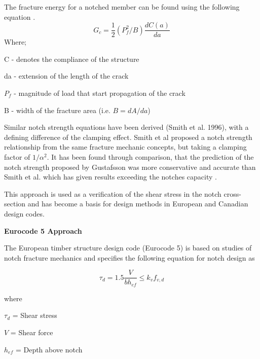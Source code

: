 \documentclass[11pt,a4paper]{article}
\numberwithin{equation}{subsection}
\begin{document}
	\noindent 	
	The fracture energy for a notched member can be found using the following equation \cite{serrano_fracture_2007}.  	 	
	\begin{equation} 		
	G_{c} = \dfrac{1}{2}(P_{f}^{2}/B) \dfrac{dC(a)}{da}  	\end{equation} 	 	
	Where;\par 	
	C - denotes the compliance of the structure\par 	
	da - extension of the length of the crack\par 	
	$P_{f}$ - magnitude of load that start propagation of the crack\par 	
	B - width of the fracture area (i.e. $B = dA/da$) 
	   
	 \vspace*{\baselineskip} 	 	
	 
	 \noindent 
	 Similar notch strength equations have been derived (Smith et al. 1996), with a defining difference of the clamping effect. Smith et al proposed a notch strength relationship from the same fracture mechanic concepts, but taking a clamping factor of $1/\alpha^{2}$. It has been found through comparison, that the prediction of the notch strength proposed by Gustafsson was more conservative and accurate than Smith et al. which has given results exceeding the notches capacity \cite{jockwer_state---art_2013}.   	
	 
	 \vspace*{\baselineskip} 	 	
	 
	 \noindent 	This approach is used as a verification of the shear stress in the notch cross-section and has become a basis for design methods in European and Canadian design codes.
	
	\vspace*{\baselineskip}
	
	\noindent
	\textbf{Eurocode 5 Approach}\par
	
	\noindent
	The European timber structure design code (Eurocode 5) is based on studies of notch fracture mechanics and specifies the following equation for notch design as
	 
	\begin{equation}
	\tau_{d} = 1.5\dfrac{V}{b h_{ef}} \leq k_{v} f_{v,d} 
	\end{equation}
     
     where\par
     $ \tau_{d} $ = Shear stress \par
     $ V $ = Shear force \par
     $ h_{ef} $ = Depth above notch \par    
     
\end{document}
